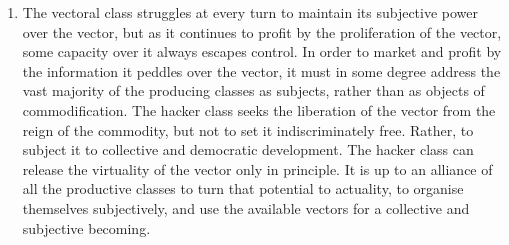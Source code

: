 \documentclass[letterpaper,12pt,english]{sphinxmanual}
\begin{document}
\begin{enumerate}
\item {} 
The vectoral class struggles at every turn to maintain its subjective power over the vector, but as it continues to profit by the proliferation of the vector, some capacity over it always escapes control. In order to market and profit by the information it peddles over the vector, it must in some degree address the vast majority of the producing classes as subjects, rather than as objects of commodification. The hacker class seeks the liberation of the vector from the reign of the commodity, but not to set it indiscriminately free. Rather, to subject it to collective and democratic development. The hacker class can release the virtuality of the vector only in principle. It is up to an alliance of all the productive classes to turn that potential to actuality, to organise themselves subjectively, and use the available vectors for a collective and subjective becoming.

\end{enumerate}
\end{document}
